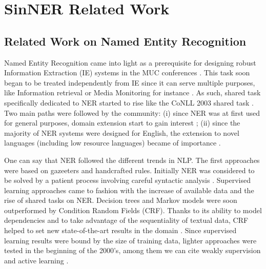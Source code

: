 \chapter{SinNER Related Work}

\section{Related Work on Named Entity Recognition}
\label{sec:sota}

Named Entity Recognition came into light as a prerequisite for designing robust Information Extraction (IE) systems in the MUC conferences \cite{grishman-sundheim-1995-design}. This task soon began to be treated independently from IE since it can serve multiple purposes, like Information retrieval or Media Monitoring for instance \cite{yangarber-etal-2002-unsupervised}. As such, shared task specifically dedicated to NER started to rise like the CoNLL 2003 shared task \cite{tjong-kim-sang-de-meulder-2003-introduction}. Two main paths were followed by the community: (i) since NER was at first used for general purposes, domain extension start to gain interest \cite{evans-2003-a}; (ii) since the majority of NER systems were designed for English, the extension to novel languages (including low resource languages) became of importance \cite{rossler-2004-adapting}.

One can say that NER followed the different trends in NLP. The first approaches were based on gazeeters and handcrafted rules. Initially NER was considered to be solved by a patient process involving careful syntactic analysis \cite{hobbs-1993-generic}. Supervised learning approaches came to fashion with the increase of available data and the rise of shared tasks on NER. Decision trees and Markov models were soon outperformed by Condition Random Fields (CRF).
Thanks to its ability to model dependencies and to take advantage of the sequentiality of textual data, CRF helped to set new state-of-the-art results in the domain \cite{finkel-etal-2005-incorporating}.
Since supervised learning results were bound by the size of training data, lighter approaches were tested in the beginning of the 2000's, among them we can cite weakly supervision \cite{yangarber-2003-counter} and active learning \cite{shen-etal-2004-multi}.

